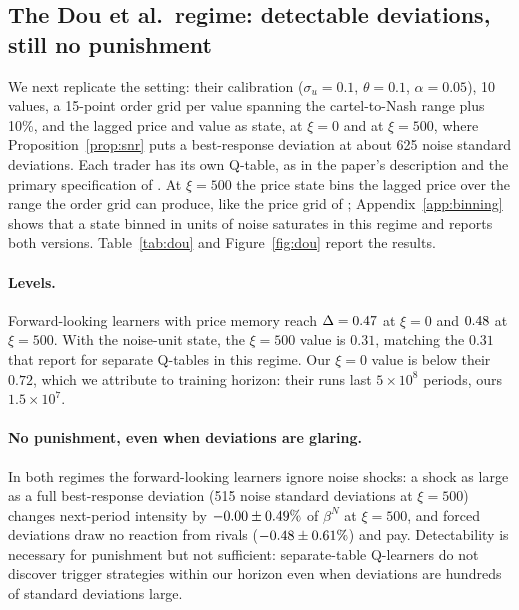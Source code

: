 \subsection{The Dou et al.\ regime: detectable deviations, still no punishment}
\label{sec:dou}

We next replicate the \citet{dou2025} setting: their calibration
($\sigma_u=0.1$, $\theta=0.1$, $\alpha=0.05$), 10 values, a 15-point order grid
per value spanning the cartel-to-Nash range plus 10\%, and the lagged price and
value as state, at $\xi=0$ and at $\xi=500$, where Proposition~\ref{prop:snr}
puts a best-response deviation at about 625 noise standard deviations. Each
trader has its own Q-table, as in the paper's description and the primary
specification of \citet{esquinas2026}. At $\xi=500$ the price state bins the
lagged price over the range the order grid can produce, like the price grid
of \citet{dou2025}; Appendix~\ref{app:binning} shows that a state binned in
units of noise saturates in this regime and reports both versions.
Table~\ref{tab:dou} and Figure~\ref{fig:dou} report the results.

\paragraph{Levels.} Forward-looking learners with price memory reach
$\Delta=0.47$ at $\xi=0$ and $0.48$ at $\xi=500$. With
the noise-unit state, the $\xi=500$ value is $0.31$, matching the $0.31$ that
\citet{esquinas2026} report for separate Q-tables in this regime. Our $\xi=0$
value is below their $0.72$, which we attribute to training horizon: their
runs last $5\times10^8$ periods, ours $1.5\times10^7$.

\paragraph{No punishment, even when deviations are glaring.} In both regimes
the forward-looking learners ignore noise shocks: a shock as large as a full
best-response deviation (515 noise standard deviations at $\xi=500$) changes
next-period intensity by $-0.00\pm0.49\%$ of $\beta^N$ at
$\xi=500$, and forced deviations draw no reaction from rivals
($-0.48\pm0.61\%$) and pay. Detectability is necessary
for punishment but not sufficient: separate-table Q-learners do not discover
trigger strategies within our horizon even when deviations are hundreds of
standard deviations large.


